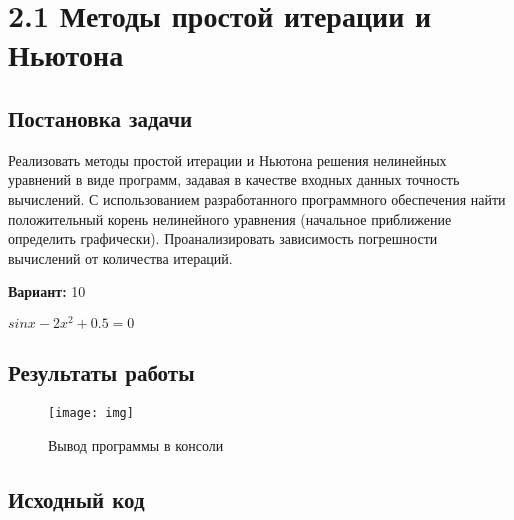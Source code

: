 \section* {2.1  Методы простой итерации и Ньютона}

\subsection{Постановка задачи}
Реализовать методы простой итерации и Ньютона решения нелинейных уравнений в виде программ, задавая в качестве входных данных точность вычислений. С использованием разработанного программного обеспечения найти положительный корень нелинейного уравнения (начальное приближение определить графически). Проанализировать зависимость погрешности вычислений от количества итераций.

{\bfseries Вариант:} 10

$sinx-2x^2+0.5=0$

\subsection{Результаты работы}
\begin{figure}[h!]
\centering
\texttt{[image: img]}
\caption{Вывод программы в консоли}
\end{figure}
\pagebreak


\subsection{Исходный код}
% 

% 
% 
% 